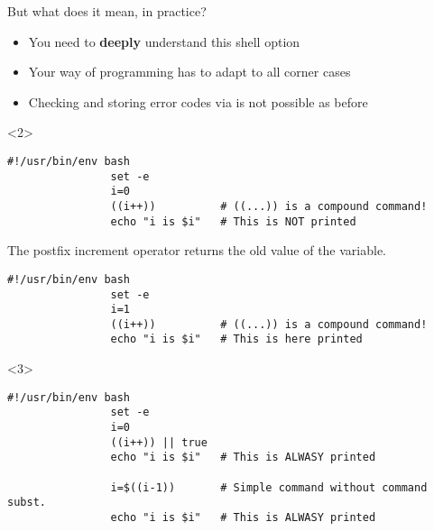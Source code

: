 \begin{frame}[fragile]{But what does it mean, in practice?}
    \vspace{-1mm}
    \begin{overlayarea}{\textwidth}{0.7\textheight}
        \begin{itemize}
            \setlength{\itemsep}{0pt}
            \item \alert<2>{You need to \textbf{deeply} understand this shell option}
            \item \alert<3-4>{Your way of programming has to adapt to all corner cases}
            \item \alert<5>{Checking and storing error codes via  is not possible as before}
        \end{itemize}
        \vspace{2mm}
        \begin{onlyenv}<2>
            \begin{lstlisting}[style=myBash]
                #!/usr/bin/env bash
                set -e
                i=0
                ((i++))          # ((...)) is a compound command!
                echo "i is $i"   # This is NOT printed
            \end{lstlisting}
            \centerline{\tiny The postfix increment operator returns the old value of the variable.}
            \begin{lstlisting}[style=myBash, aboveskip=2mm]
                #!/usr/bin/env bash
                set -e
                i=1
                ((i++))          # ((...)) is a compound command!
                echo "i is $i"   # This is here printed
            \end{lstlisting}
        \end{onlyenv}
        \begin{onlyenv}<3>
            \begin{lstlisting}[style=myBash]
                #!/usr/bin/env bash
                set -e
                i=0
                ((i++)) || true
                echo "i is $i"   # This is ALWASY printed

                i=$((i-1))       # Simple command without command subst.
                echo "i is $i"   # This is ALWASY printed


\end{lstlisting}
\end{onlyenv}
\end{overlayarea}
\end{frame}
